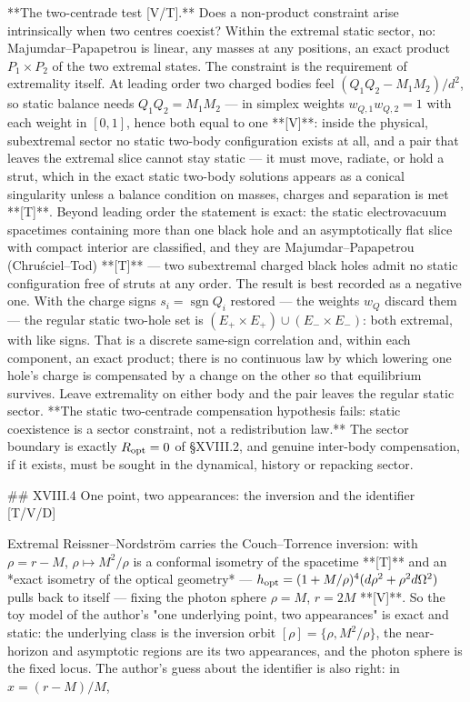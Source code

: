 **The two-centrade test [V/T].** Does a non-product constraint arise intrinsically when two centres coexist? Within the extremal static sector, no: Majumdar–Papapetrou is linear, any masses at any positions, an exact product $P_1\times P_2$ of the two extremal states. The constraint is the requirement of extremality itself. At leading order two charged bodies feel $(Q_1Q_2-M_1M_2)/d^2$, so static balance needs $Q_1Q_2 = M_1M_2$ — in simplex weights $w_{Q,1}w_{Q,2} = 1$ with each weight in $[0,1]$, hence both equal to one **[V]**: inside the physical, subextremal sector no static two-body configuration exists at all, and a pair that leaves the extremal slice cannot stay static — it must move, radiate, or hold a strut, which in the exact static two-body solutions appears as a conical singularity unless a balance condition on masses, charges and separation is met **[T]**. Beyond leading order the statement is exact: the static electrovacuum spacetimes containing more than one black hole and an asymptotically flat slice with compact interior are classified, and they are Majumdar–Papapetrou (Chruściel–Tod) **[T]** — two subextremal charged black holes admit no static configuration free of struts at any order. The result is best recorded as a negative one. With the charge signs $s_i = \operatorname{sgn}Q_i$ restored — the weights $w_Q$ discard them — the regular static two-hole set is $(E_+\times E_+)\cup(E_-\times E_-)$: both extremal, with like signs. That is a discrete same-sign correlation and, within each component, an exact product; there is no continuous law by which lowering one hole's charge is compensated by a change on the other so that equilibrium survives. Leave extremality on either body and the pair leaves the regular static sector. **The static two-centrade compensation hypothesis fails: static coexistence is a sector constraint, not a redistribution law.** The sector boundary is exactly $R_{\rm opt} = 0$ of §XVIII.2, and genuine inter-body compensation, if it exists, must be sought in the dynamical, history or repacking sector.

## XVIII.4 One point, two appearances: the inversion and the identifier [T/V/D]

Extremal Reissner–Nordström carries the Couch–Torrence inversion: with $\rho = r-M$, $\rho\mapsto M^2/\rho$ is a conformal isometry of the spacetime **[T]** and an *exact isometry of the optical geometry* — $h_{\rm opt} = (1+M/\rho)^4(d\rho^2+\rho^2d\Omega^2)$ pulls back to itself — fixing the photon sphere $\rho = M$, $r = 2M$ **[V]**. So the toy model of the author's "one underlying point, two appearances" is exact and static: the underlying class is the inversion orbit $[\rho] = \{\rho,M^2/\rho\}$, the near-horizon and asymptotic regions are its two appearances, and the photon sphere is the fixed locus. The author's guess about the identifier is also right: in $x = (r-M)/M$,


